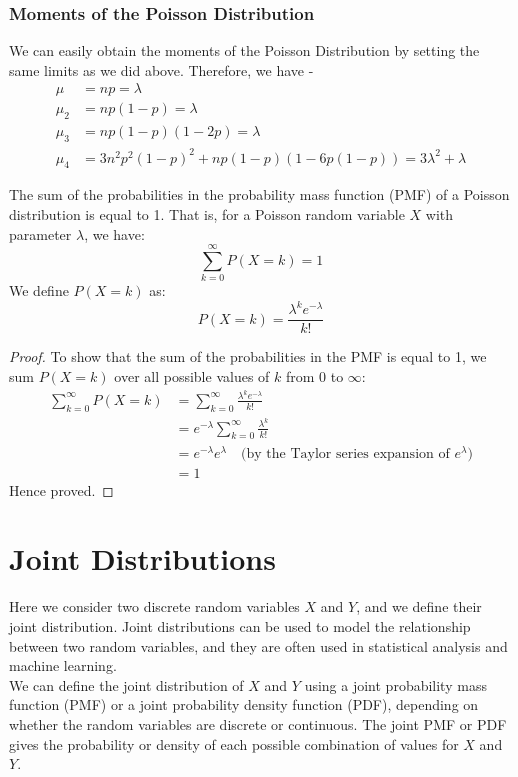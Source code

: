 \documentclass[openany]{book}
\begin{document}
\subsubsection{Moments of the Poisson Distribution}
We can easily obtain the moments of the Poisson Distribution by setting the same limits as we did above. 
Therefore, we have - 
\begin{align*}
    \mu &= np = \lambda \\
    \mu_2 &= np(1-p) = \lambda \\
    \mu_3 &= np(1-p)(1-2p) = \lambda \\
    \mu_4 &= 3n^2p^2(1-p)^2 + np(1-p)(1-6p(1-p)) = 3\lambda^2 + \lambda
\end{align*}
\begin{mytheorem}
    The sum of the probabilities in the probability mass function (PMF) of a Poisson distribution is equal to 1. That is, for a Poisson random variable $X$ with parameter $\lambda$, we have:
    $$\sum_{k=0}^{\infty} P(X = k) = 1$$
    We define $P(X = k)$ as:
    $$P(X = k) = \frac{\lambda^k e^{-\lambda}}{k!}$$
\end{mytheorem}
\begin{proof}
    To show that the sum of the probabilities in the PMF is equal to 1, we sum $P(X = k)$ over all possible values of $k$ from 0 to $\infty$:
    \begin{align*}
        \sum_{k=0}^{\infty} P(X = k) &= \sum_{k=0}^{\infty} \frac{\lambda^k e^{-\lambda}}{k!} \\
        &= e^{-\lambda} \sum_{k=0}^{\infty} \frac{\lambda^k}{k!} \\
        &= e^{-\lambda} e^{\lambda} \quad \text{(by the Taylor series expansion of } e^{\lambda}) \\
        &= 1
    \end{align*}
    Hence proved.
\end{proof}
\section{Joint Distributions}
Here we consider two discrete random variables $X$ and $Y$, and we define their joint distribution. Joint distributions can be used to model the relationship between two random variables, and they are often used in statistical analysis and machine learning. \\
We can define the joint distribution of $X$ and $Y$ using a joint probability mass function (PMF) or a joint probability density function (PDF), depending on whether the random variables are discrete or continuous. The joint PMF or PDF gives the probability or density of each possible combination of values for $X$ and $Y$.
\end{document}
